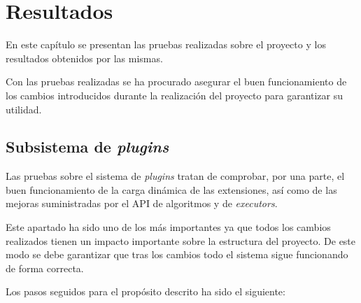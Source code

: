 \chapter{Resultados}

En este capítulo se presentan las pruebas realizadas sobre el proyecto y los resultados obtenidos por las mismas.

Con las pruebas realizadas se ha procurado asegurar el buen funcionamiento de los cambios introducidos durante la realización del proyecto para garantizar su utilidad.

\section{Subsistema de \emph{plugins}}

Las pruebas sobre el sistema de \emph{plugins} tratan de comprobar, por una parte, el buen funcionamiento de la carga dinámica de las extensiones, así como de las mejoras suministradas por el API de algoritmos y de \emph{executors}.

Este apartado ha sido uno de los más importantes ya que todos los cambios realizados tienen un impacto importante sobre la estructura del proyecto. De este modo se debe garantizar que tras los cambios todo el sistema sigue funcionando de forma correcta.

Los pasos seguidos para el propósito descrito ha sido el siguiente:

